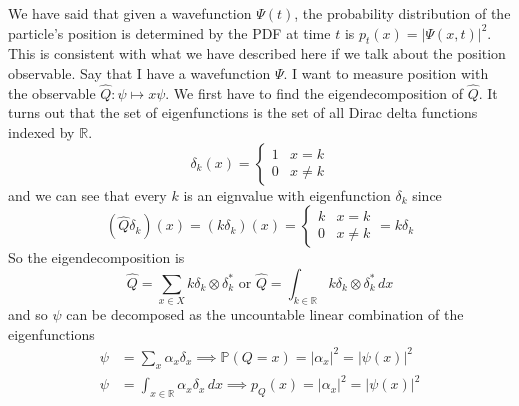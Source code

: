 \documentclass{article}
\begin{document}
  \begin{example}
    We have said that given a wavefunction $\Psi (t)$, the probability distribution of the particle's position is determined by the PDF at time $t$ is $p_t (x) = |\Psi(x, t)|^2$. This is consistent with what we have described here if we talk about the position observable. Say that I have a wavefunction $\Psi$. I want to measure position with the observable $\hat{Q} : \psi \mapsto x \psi$. We first have to find the eigendecomposition of $\hat{Q}$. It turns out that the set of eigenfunctions is the set of all Dirac delta functions indexed by $\mathbb{R}$. 
    \begin{equation} 
      \delta_k (x) = \begin{cases} 1 & x = k \\ 0 & x \neq k \end{cases} 
    \end{equation}
    and we can see that every $k$ is an eignvalue with eigenfunction $\delta_k$ since 
    \begin{equation} 
      (\hat{Q} \delta_k)(x) = (k \delta_k) (x) = \begin{cases} k & x = k \\ 0 & x \neq k \end{cases} = k \delta_k 
    \end{equation}
    So the eigendecomposition is 
    \begin{equation} 
      \hat{Q} = \sum_{x \in X} k \delta_k \otimes \delta_k^\ast \text{ or } \hat{Q} = \int_{k \in \mathbb{R}} k \delta_k \otimes \delta_k^\ast \,dx 
    \end{equation}
    and so $\psi$ can be decomposed as the uncountable linear combination of the eigenfunctions 
    \begin{align*} 
      \psi & = \sum_x \alpha_x \delta_x \implies \mathbb{P}(Q = x) = |\alpha_x|^2  = | \psi(x) |^2\\  
      \psi & = \int_{x \in \mathbb{R}} \alpha_x \delta_x \,dx \implies p_Q (x) = |\alpha_x|^2 = |\psi(x)|^2 
    \end{align*}
  \end{example}   
\end{document}
